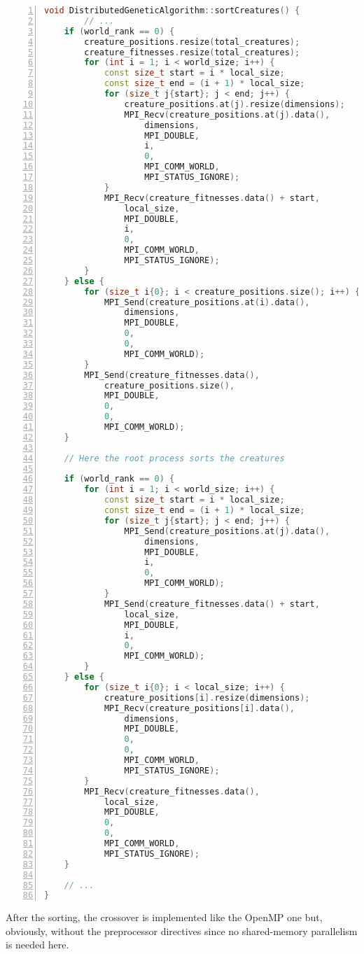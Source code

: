 \documentclass[12pt,a4paper,oneside]{article}
\begin{document}
	\begin{lstlisting}[language=C++,
		directivestyle={\color{black}},
		backgroundcolor=\color{lgrey},
    	basicstyle=\footnotesize \ttfamily \color{black} \bfseries,
		numbers=left,
		numbersep=5pt,
    	numberstyle=\tiny\color{black},
		commentstyle=\color{dkgreen},
    	rulecolor=\color{black},
    	keywordstyle=\color{purple},
    	morekeywords={size_t,std,MPI_Send,MPI_Recv},
		tabsize=2,
    	captionpos=b,
    	caption={Sorting of the population with MPI.},
    	label={listing:mpi_sorting}
	   ]
void DistributedGeneticAlgorithm::sortCreatures() {
		// ...
	if (world_rank == 0) {
		creature_positions.resize(total_creatures);
		creature_fitnesses.resize(total_creatures);
		for (int i = 1; i < world_size; i++) {
			const size_t start = i * local_size;
			const size_t end = (i + 1) * local_size;
			for (size_t j{start}; j < end; j++) {
				creature_positions.at(j).resize(dimensions);
				MPI_Recv(creature_positions.at(j).data(),
					dimensions,
					MPI_DOUBLE,
					i,
					0,
					MPI_COMM_WORLD,
					MPI_STATUS_IGNORE);
			}
			MPI_Recv(creature_fitnesses.data() + start,
				local_size,
				MPI_DOUBLE,
				i,
				0,
				MPI_COMM_WORLD,
				MPI_STATUS_IGNORE);
		}
	} else {
		for (size_t i{0}; i < creature_positions.size(); i++) {
			MPI_Send(creature_positions.at(i).data(),
				dimensions,
				MPI_DOUBLE,
				0,
				0,
				MPI_COMM_WORLD);
		}
		MPI_Send(creature_fitnesses.data(),
			creature_positions.size(),
			MPI_DOUBLE,
			0,
			0,
			MPI_COMM_WORLD);
	}

	// Here the root process sorts the creatures

	if (world_rank == 0) {
		for (int i = 1; i < world_size; i++) {
			const size_t start = i * local_size;
			const size_t end = (i + 1) * local_size;
			for (size_t j{start}; j < end; j++) {
				MPI_Send(creature_positions.at(j).data(),
					dimensions,
					MPI_DOUBLE,
					i,
					0,
					MPI_COMM_WORLD);
			}
			MPI_Send(creature_fitnesses.data() + start,
				local_size,
				MPI_DOUBLE,
				i,
				0,
				MPI_COMM_WORLD);
		}
	} else {
		for (size_t i{0}; i < local_size; i++) {
			creature_positions[i].resize(dimensions);
			MPI_Recv(creature_positions[i].data(),
				dimensions,
				MPI_DOUBLE,
				0,
				0,
				MPI_COMM_WORLD,
				MPI_STATUS_IGNORE);
		}
		MPI_Recv(creature_fitnesses.data(),
			local_size,
			MPI_DOUBLE,
			0,
			0,
			MPI_COMM_WORLD,
			MPI_STATUS_IGNORE);
	}

	// ...
}
	\end{lstlisting}

	After the sorting, the crossover is implemented like the OpenMP one but, obviously, without the preprocessor directives since no shared-memory parallelism is needed here.
\end{document}
